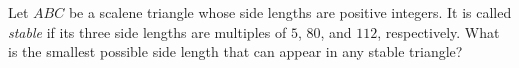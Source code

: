 Let $ABC$ be a scalene triangle whose side lengths are positive integers. It is called \emph{stable} if its three side lengths are multiples of $5$, $80$, and $112$, respectively. What is the smallest possible side length that can appear in any stable triangle?
